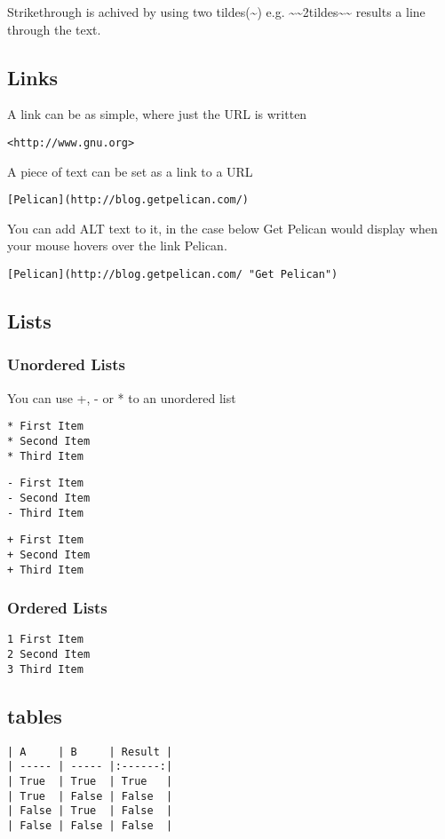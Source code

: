 \documentclass[12pt]{article}			%
\begin{document}
Strikethrough is achived by using two tildes(\~{}) e.g. \~{}\~{}2tildes\~{}\~{} results a line through the text.

\subsection{Links}
A link can be as simple, where just the URL is written 
\begin{verbatim}
<http://www.gnu.org>
\end{verbatim}
A piece of text can be set as a link to a URL
\begin{verbatim}
[Pelican](http://blog.getpelican.com/)
\end{verbatim}
You can add ALT text to it, in the case below Get Pelican would display when your mouse hovers over the link Pelican.
\begin{verbatim}
[Pelican](http://blog.getpelican.com/ "Get Pelican")
\end{verbatim}
\subsection{Lists}
\subsubsection{Unordered Lists}
You can use +, - or * to an unordered list
\begin{verbatim}
* First Item
* Second Item
* Third Item
\end{verbatim}
\begin{verbatim}
- First Item
- Second Item
- Third Item
\end{verbatim}
\begin{verbatim}
+ First Item
+ Second Item
+ Third Item
\end{verbatim}
\subsubsection{Ordered Lists}
\begin{verbatim}
1 First Item
2 Second Item
3 Third Item
\end{verbatim}

\subsection{tables}

\begin{verbatim}
| A     | B     | Result |
| ----- | ----- |:------:|
| True  | True  | True   |
| True  | False | False  |
| False | True  | False  |
| False | False | False  |

\end{verbatim}
\end{document}
